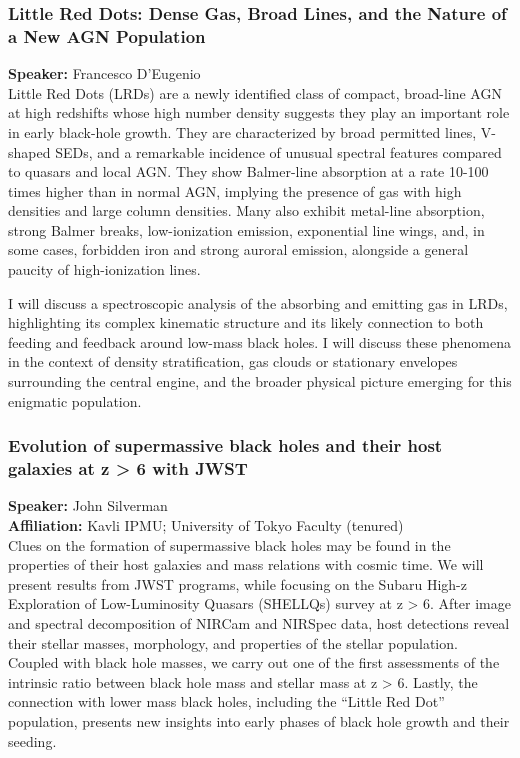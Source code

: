\hypertarget{abs-10}{}
\subsubsection*{Little Red Dots: Dense Gas, Broad Lines, and the Nature of a New AGN Population}
\textbf{Speaker:} Francesco D'Eugenio \invitedbadge{}\\

Little Red Dots (LRDs) are a newly identified class of compact, broad-line AGN at high redshifts whose high number density suggests they play an important role in early black-hole growth. They are characterized by broad permitted lines, V-shaped SEDs, and a remarkable incidence of unusual spectral features compared to quasars and local AGN. They show Balmer-line absorption at a rate 10-100 times higher than in normal AGN, implying the presence of gas with high densities and large column densities. Many also exhibit metal-line absorption, strong Balmer breaks, low-ionization emission, exponential line wings, and, in some cases, forbidden iron and strong auroral emission, alongside a general paucity of high-ionization lines.

I will discuss a spectroscopic analysis of the absorbing and emitting gas in LRDs, highlighting its complex kinematic structure and its likely connection to both feeding and feedback around low-mass black holes. I will discuss these phenomena in the context of density stratification, gas clouds or stationary envelopes surrounding the central engine, and the broader physical picture emerging for this enigmatic population.

\hypertarget{abs-54}{}
\subsubsection*{Evolution of supermassive black holes and their host galaxies at z > 6 with JWST}
\textbf{Speaker:} John Silverman \\
\textbf{Affiliation:} Kavli IPMU; University of Tokyo \textperiodcentered{} Faculty (tenured)\\
Clues on the formation of supermassive black holes may be found in the properties of their host galaxies and mass relations with cosmic time. We will present results from JWST programs, while focusing on the Subaru High-z Exploration of Low-Luminosity Quasars (SHELLQs) survey at z > 6. After image and spectral decomposition of NIRCam and NIRSpec data, host detections reveal their stellar masses, morphology, and properties of the stellar population. Coupled with black hole masses, we carry out one of the first assessments of the intrinsic ratio between black hole mass and stellar mass at z > 6. Lastly, the connection with lower mass black holes, including the “Little Red Dot” population, presents new insights into early phases of black hole growth and their seeding.

